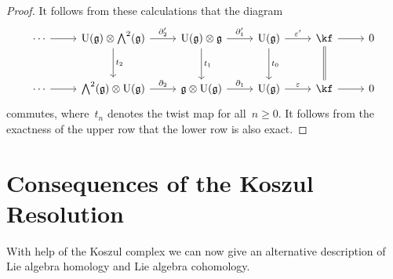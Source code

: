 \begin{proof}
	It follows from these calculations that the diagram
	\[
		\begin{tikzcd}[row sep = large]
			\dotsb
			\arrow{r}
			&
			\Univ(\glie) \otimes \Exterior^2(\glie)
			\arrow{r}[above]{\del'_2}
			\arrow{d}[right]{t_2}
			&
			\Univ(\glie) \otimes \glie
			\arrow{r}[above]{\del'_1}
			\arrow{d}[right]{t_1}
			&
			\Univ(\glie)
			\arrow{r}[above]{\varepsilon'}
			\arrow{d}[right]{t_0}
			&
			\kf
			\arrow{r}
			\arrow[equal]{d}
			&
			0
			\\
			\dotsb
			\arrow{r}
			&
			\Exterior^2(\glie) \otimes \Univ(\glie)
			\arrow{r}[above]{\del_2}
			&
			\glie \otimes \Univ(\glie)
			\arrow{r}[above]{\del_1}
			&
			\Univ(\glie)
			\arrow{r}[above]{\varepsilon}
			&
			\kf
			\arrow{r}
			&
			0
		\end{tikzcd}
	\]
	commutes, where~$t_n$ denotes the twist map for all~$n \geq 0$.
	It follows from the exactness of the upper row that the lower row is also exact.
\end{proof}




\section{Consequences of the Koszul Resolution}

\begin{fluff}
	With help of the Koszul complex we can now give an alternative description of Lie algebra homology and Lie algebra cohomology.
\end{fluff}


